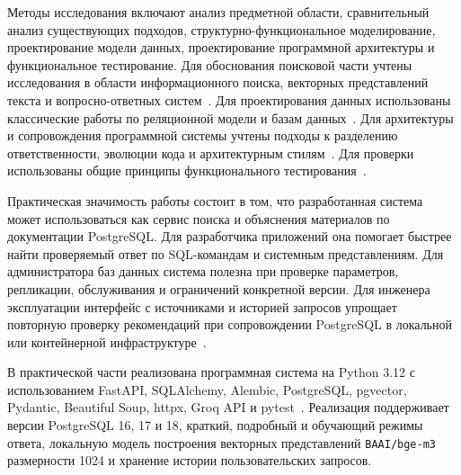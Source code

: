 Методы исследования включают анализ предметной области, сравнительный анализ существующих подходов, структурно-функциональное моделирование, проектирование модели данных, проектирование программной архитектуры и функциональное тестирование. Для обоснования поисковой части учтены исследования в области информационного поиска, векторных представлений текста и вопросно-ответных систем~\cite{manning2008,bm25-prf,hnsw2016,faiss2017}. Для проектирования данных использованы классические работы по реляционной модели и базам данных~\cite{codd1970,ullman1988,date2004,garcia2008,silberschatz2020,elmasri2016}. Для архитектуры и сопровождения программной системы учтены подходы к разделению ответственности, эволюции кода и архитектурным стилям~\cite{martin2017,fowler2002,fowler2018,bass2021,larman2004,newman2021,richards2020}. Для проверки использованы общие принципы функционального тестирования~\cite{beizer1990,myers2011,kaner1999}.

Практическая значимость работы состоит в том, что разработанная система может использоваться как сервис поиска и объяснения материалов по документации PostgreSQL. Для разработчика приложений она помогает быстрее найти проверяемый ответ по SQL-командам и системным представлениям. Для администратора баз данных система полезна при проверке параметров, репликации, обслуживания и ограничений конкретной версии. Для инженера эксплуатации интерфейс с источниками и историей запросов упрощает повторную проверку рекомендаций при сопровождении PostgreSQL в локальной или контейнерной инфраструктуре~\cite{docker-docs,postgres-logical-replication-16,postgres-runtime-config-repl-16}.

В практической части реализована программная система на Python 3.12 с использованием FastAPI, SQLAlchemy, Alembic, PostgreSQL, pgvector, Pydantic, Beautiful Soup, httpx, Groq API и pytest~\cite{fastapi-docs,pydantic-docs,sqlalchemy-docs,alembic-docs,pgvector,beautifulsoup-docs,httpx-docs,groq-docs,pytest-docs}. Реализация поддерживает версии PostgreSQL 16, 17 и 18, краткий, подробный и обучающий режимы ответа, локальную модель построения векторных представлений \texttt{BAAI/bge-m3} размерности 1024 и хранение истории пользовательских запросов.
